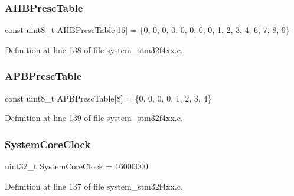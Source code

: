 \subsubsection{\texorpdfstring{AHBPrescTable}{AHBPrescTable}}
{\footnotesize\ttfamily const uint8\+\_\+t A\+H\+B\+Presc\+Table\mbox{[}16\mbox{]} = \{0, 0, 0, 0, 0, 0, 0, 0, 1, 2, 3, 4, 6, 7, 8, 9\}}



Definition at line 138 of file system\+\_\+stm32f4xx.\+c.

\mbox{\label{group___s_t_m32_f4xx___system___private___variables_ga5b4f8b768465842cf854a8f993b375e9}} 
\subsubsection{\texorpdfstring{APBPrescTable}{APBPrescTable}}
{\footnotesize\ttfamily const uint8\+\_\+t A\+P\+B\+Presc\+Table\mbox{[}8\mbox{]} = \{0, 0, 0, 0, 1, 2, 3, 4\}}



Definition at line 139 of file system\+\_\+stm32f4xx.\+c.

\mbox{\label{group___s_t_m32_f4xx___system___private___variables_gaa3cd3e43291e81e795d642b79b6088e6}} 
\subsubsection{\texorpdfstring{SystemCoreClock}{SystemCoreClock}}
{\footnotesize\ttfamily uint32\+\_\+t System\+Core\+Clock = 16000000}



Definition at line 137 of file system\+\_\+stm32f4xx.\+c.


